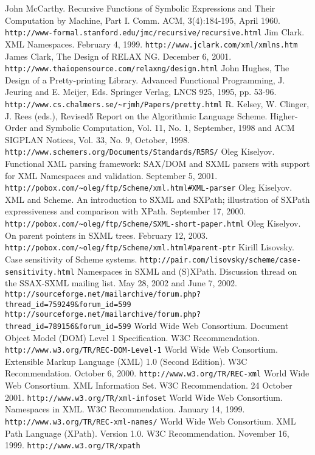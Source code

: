 \documentclass[10pt]{article}
\begin{document}
\begin{thebibliography}{}
 John McCarthy. Recursive Functions of Symbolic Expressions
and Their Computation by Machine, Part I. Comm. ACM, 3(4):184-195, April 1960. \texttt{http://www-formal.stanford.edu/jmc/recursive/recursive.html} 
 Jim Clark. XML Namespaces. February 4, 1999. \texttt{http://www.jclark.com/xml/xmlns.htm} 
 James Clark, The Design of RELAX NG. December 6, 2001. \texttt{http://www.thaiopensource.com/relaxng/design.html} 
 John Hughes, The Design of a Pretty-printing Library. Advanced Functional Programming, J. Jeuring and E. Meijer, Eds. Springer Verlag, LNCS 925, 1995, pp. 53-96. \texttt{http://www.cs.chalmers.se/\textasciitilde{}rjmh/Papers/pretty.html} 
 R. Kelsey, W. Clinger, J. Rees (eds.), Revised5 Report on
                      the Algorithmic Language Scheme. Higher-Order and
                      Symbolic Computation, Vol. 11, No. 1, September, 1998
                      and
                      ACM SIGPLAN Notices, Vol. 33, No. 9, October, 1998. \texttt{http://www.schemers.org/Documents/Standards/R5RS/} 
 Oleg Kiselyov. Functional XML parsing framework: SAX/DOM and
SXML parsers with support for XML Namespaces and validation. September
5, 2001. \texttt{http://pobox.com/\textasciitilde{}oleg/ftp/Scheme/xml.html\#XML-parser} 
 Oleg Kiselyov. XML and Scheme. An introduction to SXML and SXPath;
illustration of SXPath expressiveness and comparison with
XPath. September 17, 2000. \texttt{http://pobox.com/\textasciitilde{}oleg/ftp/Scheme/SXML-short-paper.html} 
 Oleg Kiselyov. On parent pointers in SXML trees. February 12, 2003. \texttt{http://pobox.com/\textasciitilde{}oleg/ftp/Scheme/xml.html\#parent-ptr} 
 Kirill Lisovsky. Case sensitivity of Scheme systems. \texttt{http://pair.com/lisovsky/scheme/case-sensitivity.html} 
 Namespaces in SXML and (S)XPath. Discussion thread on the SSAX-SXML mailing list. May 28, 2002 and June 7, 2002. \texttt{http://sourceforge.net/mailarchive/forum.php?thread\_id=759249\&forum\_id=599}  \texttt{http://sourceforge.net/mailarchive/forum.php?thread\_id=789156\&forum\_id=599} 
 World Wide Web Consortium. Document Object Model (DOM) Level 1
Specification. W3C Recommendation. \texttt{http://www.w3.org/TR/REC-DOM-Level-1} 
 World Wide Web Consortium. Extensible Markup Language (XML)
1.0 (Second Edition). W3C Recommendation. October 6, 2000. \texttt{http://www.w3.org/TR/REC-xml} 
 World Wide Web Consortium. XML Information Set.  W3C Recommendation. 24 October 2001. \texttt{http://www.w3.org/TR/xml-infoset} 
 World Wide Web Consortium. Namespaces in XML. W3C Recommendation. January 14, 1999. \texttt{http://www.w3.org/TR/REC-xml-names/} 
 World Wide Web Consortium. XML Path Language (XPath).
Version 1.0. W3C Recommendation. November 16, 1999. \texttt{http://www.w3.org/TR/xpath} 
\end{thebibliography}
\end{document}
